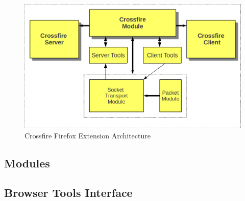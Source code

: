 \begin{figure}[htp]
  \includegraphics  [width = 86 mm] {figures/crossfire-arch4.png}
  \caption{Crossfire Firefox Extension Architecture}
 \label{fig:crossfire-arch}
\end{figure}

\subsection{Modules}

\subsection {Browser Tools Interface}